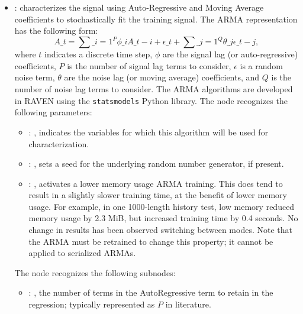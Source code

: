 \begin{itemize}
    \item {}:
      characterizes the signal using Auto-Regressive and Moving Average         coefficients to
      stochastically fit the training signal.         The ARMA representation has the following
      form:         \begin{equation*}           A\_t = \sum\_{i=1}^P \phi\_i A\_{t-i} + \epsilon\_t +
      \sum\_{j=1}^Q \theta\_j \epsilon\_{t-j},         \end{equation*}         where $t$ indicates a
      discrete time step, $\phi$ are the signal lag (or auto-regressive)         coefficients, $P$
      is the number of signal lag terms to consider, $\epsilon$ is a random noise         term,
      $\theta$ are the noise lag (or moving average) coefficients, and $Q$ is the number of
      noise lag terms to consider. The ARMA algorithms are developed in RAVEN using the
      \texttt{statsmodels} Python library.
      The  node recognizes the following parameters:
        \begin{itemize}
          \item {}: , 
            indicates the variables for which this algorithm will be used for characterization.
          \item {}: , 
            sets a seed for the underlying random number generator, if present.
          \item {}: , 
            activates a lower memory usage ARMA training. This does tend to result
            in a slightly slower training time, at the benefit of lower memory usage. For
            example, in one 1000-length history test, low memory reduced memory usage by 2.3
            MiB, but increased training time by 0.4 seconds. No change in results has been
            observed switching between modes. Note that the ARMA must be
            retrained to change this property; it cannot be applied to serialized ARMAs. 
      \end{itemize}

      The  node recognizes the following subnodes:
      \begin{itemize}
        \item {}: , 
          the number of terms in the AutoRegressive term to retain in the
          regression; typically represented as $P$ in literature.


\end{itemize}
\end{itemize}
